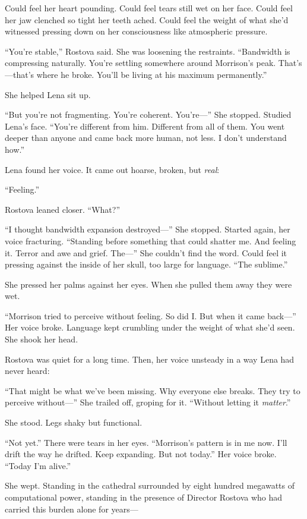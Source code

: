 Could feel her heart pounding. Could feel tears still wet on her face. Could feel her jaw clenched so tight her teeth ached. Could feel the weight of what she'd witnessed pressing down on her consciousness like atmospheric pressure.

``You're stable,'' Rostova said. She was loosening the restraints. ``Bandwidth is compressing naturally. You're settling somewhere around Morrison's peak. That's—that's where he broke. You'll be living at his maximum permanently.''

She helped Lena sit up.

``But you're not fragmenting. You're coherent. You're—'' She stopped. Studied Lena's face. ``You're different from him. Different from all of them. You went deeper than anyone and came back more human, not less. I don't understand how.''

Lena found her voice. It came out hoarse, broken, but \textit{real}:

``Feeling.''

Rostova leaned closer. ``What?''

``I thought bandwidth expansion destroyed—'' She stopped. Started again, her voice fracturing. ``Standing before something that could shatter me. And feeling it. Terror and awe and grief. The—'' She couldn't find the word. Could feel it pressing against the inside of her skull, too large for language. ``The sublime.''

She pressed her palms against her eyes. When she pulled them away they were wet.

``Morrison tried to perceive without feeling. So did I. But when it came back—'' Her voice broke. Language kept crumbling under the weight of what she'd seen. She shook her head.

Rostova was quiet for a long time. Then, her voice unsteady in a way Lena had never heard:

``That might be what we've been missing. Why everyone else breaks. They try to perceive without—'' She trailed off, groping for it. ``Without letting it \textit{matter}.''

She stood. Legs shaky but functional.

``Not yet.'' There were tears in her eyes. ``Morrison's pattern is in me now. I'll drift the way he drifted. Keep expanding. But not today.'' Her voice broke. ``Today I'm alive.''

She wept. Standing in the cathedral surrounded by eight hundred megawatts of computational power, standing in the presence of Director Rostova who had carried this burden alone for years—

